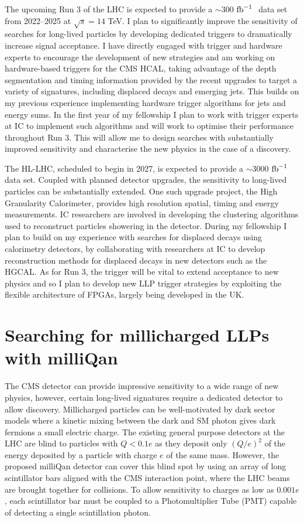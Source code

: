 \documentclass[11pt,a4paper]{article}
\theoremstyle{plain} \numberwithin{equation}{section}
\theoremstyle{definition}
\DeclareRobustCommand{\ifb}{$\rm{fb}^{-1}~$}
\begin{document}
The upcoming Run 3 of the LHC is expected to provide a $\sim 300$ \ifb
data set from 2022--2025 at $\sqrt{s} = 14$ TeV. 
I plan to significantly improve the sensitivity
of searches for long-lived particles by developing dedicated triggers to 
dramatically increase signal acceptance.
I have directly engaged with trigger and hardware experts 
to encourage the development of new strategies
and am working on hardware-based triggers for the CMS HCAL, 
taking advantage of the depth segmentation and timing 
information provided by the recent upgrades to target a variety of signatures, 
including displaced decays and emerging jets. This builds on my previous experience 
implementing hardware trigger algorithms for jets and energy sums. 
In the first year of my fellowship I plan to
work with trigger experts at IC to implement such algorithms and will 
work to optimise their performance throughout Run 3. This will allow me to design 
searches with substantially improved sensitivity and characterise the new physics in
the case of a discovery. 

The HL-LHC, scheduled to begin in 2027, is expected to provide a $\sim 3000$ \ifb
data set. Coupled with planned detector upgrades, the sensitivity to long-lived particles
can be substantially extended. One such upgrade project, the High Granularity Calorimeter, 
provides high resolution spatial, timing and energy measurements. IC researchers are involved in 
developing the clustering algorithms used to reconstruct particles showering in the detector. 
During my fellowship I plan to build on my experience with searches for 
displaced decays using calorimetry detectors, by collaborating with researchers at IC
to develop reconstruction methods for displaced decays in new detectors such as the HGCAL.
As for Run 3, the trigger will be vital to extend acceptance to new physics and so I plan
to develop new LLP trigger strategies by exploiting the flexible architecture of FPGAs, 
largely being developed in the UK. 


\section*{Searching for millicharged LLPs with milliQan}

The CMS detector can provide impressive sensitivity to a wide
range of new physics, however, certain long-lived signatures
require a dedicated detector to allow discovery. Millicharged 
particles can be well-motivated by dark sector 
models where a kinetic mixing between the dark and SM photon 
gives dark fermions a small electric charge.
The existing general purpose detectors at the LHC are blind to particles with
$Q< 0.1 e$ as they deposit only $(Q/e)^2$ of the energy 
deposited by a particle with charge $e$ of
the same mass. However, the proposed milliQan detector can cover this blind spot 
by using an array of long scintillator
bars aligned with the CMS interaction point, where the LHC beams are
brought together for collisions. To allow sensitivity to charges as low 
as $0.001 e$, each scintillator bar must be coupled to a
Photomultiplier Tube (PMT) capable of detecting a single scintillation photon.
\end{document}
